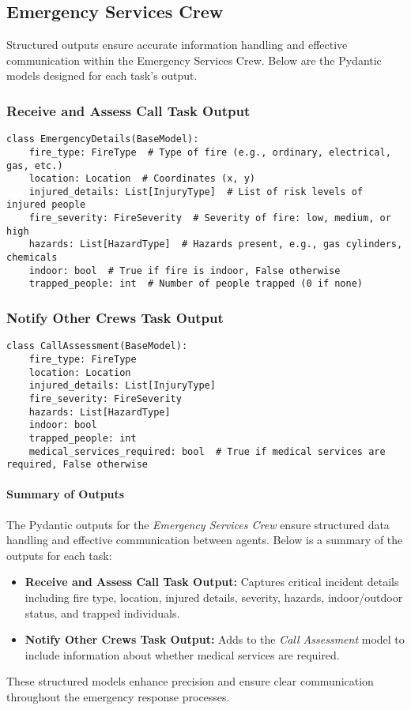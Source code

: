 \subsection{Emergency Services Crew}

Structured outputs ensure accurate information handling and effective communication within the Emergency Services Crew. Below 
are the Pydantic models designed for each task's output.

\subsubsection{Receive and Assess Call Task Output}

\begin{lstlisting}[caption={Pydantic model for Receive and Assess Call Task Output}] 
class EmergencyDetails(BaseModel):
    fire_type: FireType  # Type of fire (e.g., ordinary, electrical, gas, etc.)
    location: Location  # Coordinates (x, y)
    injured_details: List[InjuryType]  # List of risk levels of injured people
    fire_severity: FireSeverity  # Severity of fire: low, medium, or high
    hazards: List[HazardType]  # Hazards present, e.g., gas cylinders, chemicals
    indoor: bool  # True if fire is indoor, False otherwise
    trapped_people: int  # Number of people trapped (0 if none)
\end{lstlisting}

\subsubsection{Notify Other Crews Task Output}

\begin{lstlisting}[caption={Pydantic model for Notify Other Crews Task Output}] 
class CallAssessment(BaseModel):
    fire_type: FireType
    location: Location
    injured_details: List[InjuryType]
    fire_severity: FireSeverity
    hazards: List[HazardType]
    indoor: bool
    trapped_people: int
    medical_services_required: bool  # True if medical services are required, False otherwise
\end{lstlisting}

\paragraph{Summary of Outputs}
The Pydantic outputs for the \textit{Emergency Services Crew} ensure structured data handling and effective communication between agents. Below is a summary of the outputs for each task:

\begin{itemize}
    \item \textbf{Receive and Assess Call Task Output:} Captures critical incident details including fire type, location, injured details, severity, hazards, indoor/outdoor status, and trapped individuals.
    \item \textbf{Notify Other Crews Task Output:} Adds to the \textit{Call Assessment} model to include information about 
    whether medical services are required.
\end{itemize}

These structured models enhance precision and ensure clear communication throughout the emergency response processes.
    
